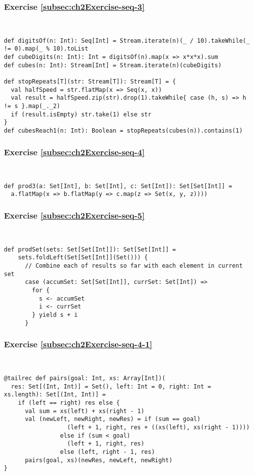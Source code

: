 \subsubsection*{Exercise \ref{subsec:ch2Exercise-seq-3}}

~
\begin{lstlisting}
def digitsOf(n: Int): Seq[Int] = Stream.iterate(n)(_ / 10).takeWhile(_ != 0).map(_ % 10).toList
def cubeDigits(n: Int): Int = digitsOf(n).map(x => x*x*x).sum
def cubes(n: Int): Stream[Int] = Stream.iterate(n)(cubeDigits)

def stopRepeats[T](str: Stream[T]): Stream[T] = {
  val halfSpeed = str.flatMap(x => Seq(x, x))
  val result = halfSpeed.zip(str).drop(1).takeWhile{ case (h, s) => h != s }.map(_._2)
  if (result.isEmpty) str.take(1) else str
}
def cubesReach1(n: Int): Boolean = stopRepeats(cubes(n)).contains(1)
\end{lstlisting}


\subsubsection*{Exercise \ref{subsec:ch2Exercise-seq-4}}

~
\begin{lstlisting}
def prod3(a: Set[Int], b: Set[Int], c: Set[Int]): Set[Set[Int]] =
  a.flatMap(x => b.flatMap(y => c.map(z => Set(x, y, z))))
\end{lstlisting}


\subsubsection*{Exercise \ref{subsec:ch2Exercise-seq-5}}

~
\begin{lstlisting}
def prodSet(sets: Set[Set[Int]]): Set[Set[Int]] =
    sets.foldLeft(Set[Set[Int]](Set())) {
      // Combine each of results so far with each element in current set
      case (accumSet: Set[Set[Int]], currSet: Set[Int]) =>
        for {
          s <- accumSet
          i <- currSet
        } yield s + i
      }
\end{lstlisting}


\subsubsection*{Exercise \ref{subsec:ch2Exercise-seq-4-1}}

~
\begin{lstlisting}
@tailrec def pairs(goal: Int, xs: Array[Int])(
  res: Set[(Int, Int)] = Set(), left: Int = 0, right: Int = xs.length): Set[(Int, Int)] =
    if (left == right) res else {
      val sum = xs(left) + xs(right - 1)
      val (newLeft, newRight, newRes) = if (sum == goal) 
                  (left + 1, right, res + ((xs(left), xs(right - 1)))) 
                else if (sum < goal)
                  (left + 1, right, res)
                else (left, right - 1, res)
      pairs(goal, xs)(newRes, newLeft, newRight)
}
\end{lstlisting}



